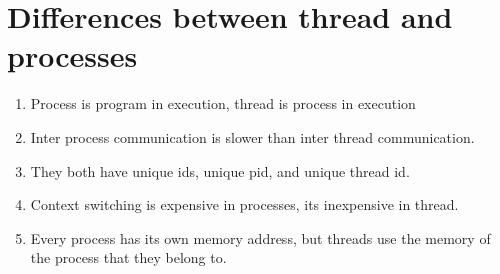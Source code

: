 \documentclass[11pt]{article}
\begin{document}
\section{Differences between thread and processes}
\begin{enumerate}
	\item Process is program in execution, thread is process in execution
	\item Inter process communication is slower than inter thread communication.
	\item They both have unique ids, unique pid, and unique thread id.
	\item Context switching is expensive in processes, its inexpensive in thread.
	\item Every process has its own memory address, but threads use the memory of the process that they belong to.
\end{enumerate}
\end{document}
